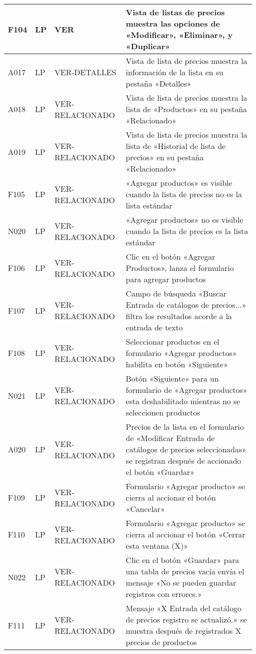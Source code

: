 \begin{landscape}
\begin{longtable}[htb]{|l|l|p{5.0cm}|p{13.0cm}|}
F104 & LP & VER & Vista de listas de precios muestra las opciones de «Modificar», «Eliminar», y «Duplicar» \\ \hline
A017 & LP & VER-DETALLES & Vista de lista de precios muestra la información de la lista en su pestaña «Detalles» \\ \hline
A018 & LP & VER-RELACIONADO & Vista de lista de precios muestra la lista de «Productos» en su pestaña «Relacionado» \\ \hline
A019 & LP & VER-RELACIONADO & Vista de lista de precios muestra la lista de «Historial de lista de precios» en su pestaña «Relacionado» \\ \hline
F105 & LP & VER-RELACIONADO & «Agregar productos» es visible cuando la lista de precios no es la lista estándar \\ \hline
N020 & LP & VER-RELACIONADO & «Agregar productos» no es visible cuando la lista de precios es la lista estándar \\ \hline
F106 & LP & VER-RELACIONADO & Clic en el botón «Agregar Productos», lanza el formulario para agregar productos \\ \hline
F107 & LP & VER-RELACIONADO & Campo de búsqueda «Buscar Entrada de catálogos de precios...» filtra los resultados acorde a la entrada de texto \\ \hline
F108 & LP & VER-RELACIONADO & Seleccionar productos en el formulario «Agregar productos» habilita en botón «Siguiente» \\ \hline
N021 & LP & VER-RELACIONADO & Botón «Siguiente» para un formulario de «Agregar productos» esta deshabilitado mientras no se seleccionen productos \\ \hline
A020 & LP & VER-RELACIONADO & Precios de la lista en el formulario de «Modificar Entrada de catálogos de precios seleccionadas» se registran después de accionado el botón «Guardar» \\ \hline
F109 & LP & VER-RELACIONADO & Formulario «Agregar producto» se cierra al accionar el botón «Cancelar» \\ \hline
F110 & LP & VER-RELACIONADO & Formulario «Agregar producto» se cierra al accionar el botón «Cerrar esta ventana (X)» \\ \hline
N022 & LP & VER-RELACIONADO & Clic en el botón «Guardar» para una tabla de precios vacía envía el mensaje «No se pueden guardar registros con errores.» \\ \hline
F111 & LP & VER-RELACIONADO & Mensaje «X Entrada del catálogo de precios registro se actualizó.» se muestra después de registrados X precios de productos \\ \hline

\end{longtable}
\end{landscape}
